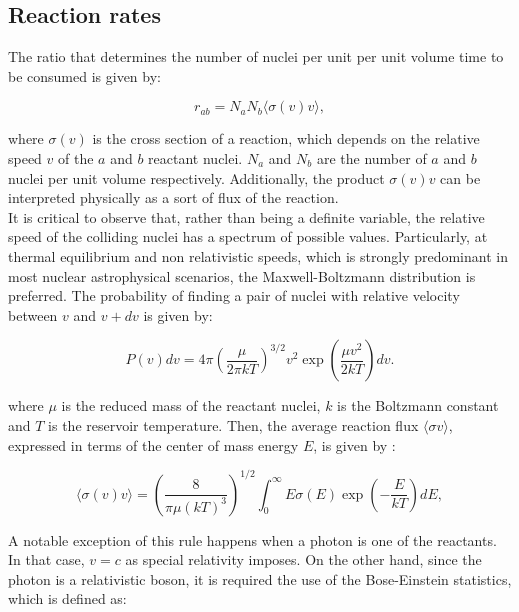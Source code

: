 \documentclass[openany]{book}
\begin{document}
\subsection{Reaction rates} \label{sub:reactionRates}

The ratio that determines the number of nuclei per unit per unit volume time to be consumed is given by: 

\begin{equation}  \label{eq:reactionRate_generic}
	r_{ab} = N_aN_b \langle \sigma (v)  v \rangle,
\end{equation}

where $\sigma(v)$ is the cross section of a reaction, which depends on the relative speed $v$ of the $a$ and $b$ reactant nuclei. $N_a$ and $N_b$ are the number of $a$ and $b$ nuclei per unit volume respectively. Additionally, the  product $\sigma (v) v$ can be interpreted physically as a sort of flux of the reaction. \\

It is critical to observe that, rather than being a definite variable, the relative speed of the colliding nuclei has a spectrum of possible values. Particularly, at thermal equilibrium and non relativistic speeds, which is strongly predominant in most nuclear astrophysical scenarios, the Maxwell-Boltzmann distribution is preferred. The probability of finding a pair of nuclei with relative velocity  between $v$ and $v + dv$ is given by:

\begin{equation} \label{eq:reactionRate_maxwellBoltzmann}
	P(v)dv = 4\pi \left( \frac{\mu}{2\pi kT}\right)^{3/2} v^2 \exp{\left({\frac{\mu v^2}{2kT}}\right)}dv.
\end{equation}


where $\mu$ is the reduced mass of the reactant nuclei,  $k$ is the Boltzmann constant and $T$ is the reservoir temperature. Then, the average reaction flux $\langle \sigma v \rangle $, expressed in terms of the center of mass energy $E$, is given by \cite{ueda_sargeant_pato_hussein_2004}:

\begin{equation}  \label{eq:reactionRate_definition}
	\langle \sigma(v) v \rangle = \left(\frac{8}{\pi \mu (kT)^3 }\right)^{1/2}  \int_0^{\infty} { E \sigma(E) \exp\left({-\frac{E}{kT}}\right)  dE},
\end{equation}


A notable exception of this rule happens when a photon is one of the reactants. In that case, $v = c$ as special relativity imposes. On the other hand, since the photon is a relativistic boson, it is required the use of the Bose-Einstein statistics, which is defined as:  
\end{document}

